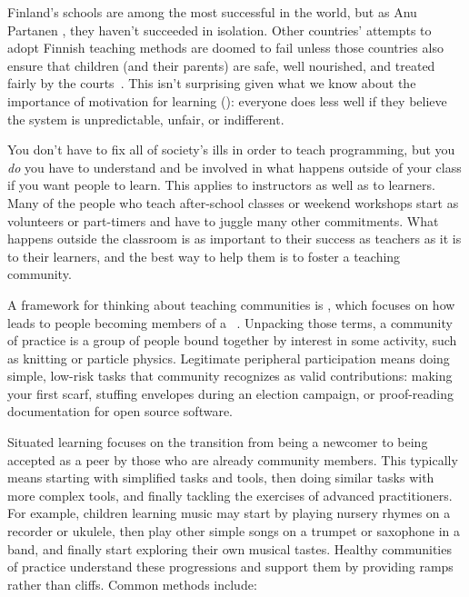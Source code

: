 
Finland's schools are among the most successful in the world,
but as Anu Partanen ,
they haven't succeeded in isolation.
Other countries' attempts to adopt Finnish teaching methods are doomed to fail
unless those countries also ensure that children (and their parents) are safe,
well nourished,
and treated fairly by the courts~\cite{Sahl2015,Wilk2011}.
This isn't surprising given what we know about the importance of motivation for learning ():
everyone does less well if they believe the system is unpredictable, unfair, or indifferent.

You don't have to fix all of society's ills in order to teach programming,
but you \emph{do} you have to understand and be involved in
what happens outside of your class if you want people to learn.
This applies to instructors as well as to learners.
Many of the people who teach after-school classes or weekend workshops
start as volunteers or part-timers
and have to juggle many other commitments.
What happens outside the classroom is as important to their success as teachers
as it is to their learners,
and the best way to help them is to foster a teaching community.

A framework for thinking about teaching communities is ,
which focuses on how 
leads to people becoming members of
a ~\cite{Weng2015}.
Unpacking those terms,
a community of practice is a group of people bound together by interest in some activity,
such as knitting or particle physics.
Legitimate peripheral participation means doing simple, low-risk tasks
that community recognizes as valid contributions:
making your first scarf,
stuffing envelopes during an election campaign,
or proof-reading documentation for open source software.

Situated learning focuses on the transition from being a newcomer
to being accepted as a peer by those who are already community members.
This typically means starting with simplified tasks and tools,
then doing similar tasks with more complex tools,
and finally tackling the exercises of advanced practitioners.
For example,
children learning music may start by playing nursery rhymes on a recorder or ukulele,
then play other simple songs on a trumpet or saxophone in a band,
and finally start exploring their own musical tastes.
Healthy communities of practice understand these progressions
and support them by providing ramps rather than cliffs.
Common methods include:

